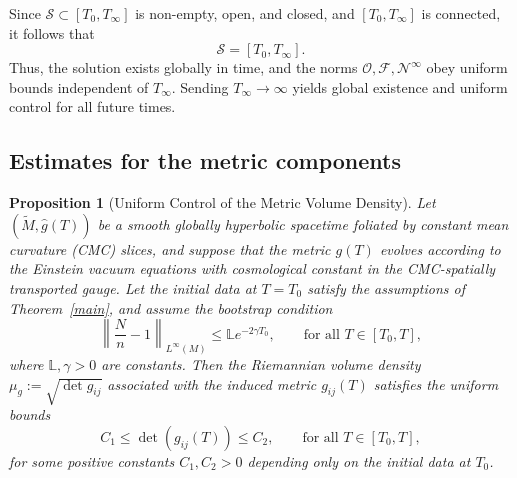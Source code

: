 \documentclass{amsart}
\newtheorem{proposition}{Proposition}[section]
\begin{document}
\noindent Since $\mathcal{S} \subset [T_0, T_\infty]$ is non-empty, open, and closed, and $[T_0, T_\infty]$ is connected, it follows that
\[
\mathcal{S} = [T_0, T_\infty].
\]
Thus, the solution exists globally in time, and the norms $\mathcal{O}, \mathcal{F}, \mathcal{N}^\infty$ obey uniform bounds independent of $T_\infty$. Sending $T_\infty \to \infty$ yields global existence and uniform control for all future times.
   

\subsection{Estimates for the metric components}
\label{metriccontrol}
\begin{proposition}[Uniform Control of the Metric Volume Density]
\label{metric1}
Let $(\widetilde{M}, \widehat{g}(T))$ be a smooth globally hyperbolic spacetime foliated by constant mean curvature (CMC) slices, and suppose that the metric \( g(T) \) evolves according to the Einstein vacuum equations with cosmological constant in the CMC-spatially transported gauge. Let the initial data at \( T = T_0 \) satisfy the assumptions of Theorem~\ref{main}, and assume the bootstrap condition
\[
\left\| \frac{N}{n} - 1 \right\|_{L^\infty(M)} \leq \mathds{L} e^{-2\gamma T_{0}}, \qquad \text{for all } T \in [T_0, T],
\]
where \( \mathds{L}, \gamma > 0 \) are constants. Then the Riemannian volume density \( \mu_g := \sqrt{\det g_{ij}} \) associated with the induced metric \( g_{ij}(T) \) satisfies the uniform bounds
\[
C_1 \leq \det(g_{ij}(T)) \leq C_2, \qquad \text{for all } T \in [T_0, T],
\]
for some positive constants \( C_1, C_2 > 0 \) depending only on the initial data at \( T_0 \).
\end{proposition}
\end{document}
